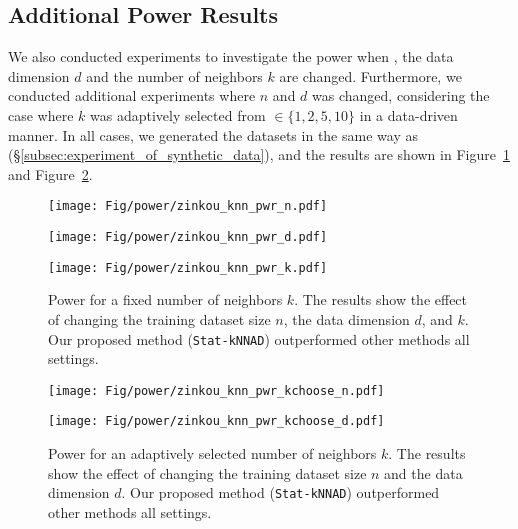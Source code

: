 \subsection{Additional Power Results}
\label{app:appC2}
%
We also conducted experiments to investigate the power when , the data dimension $d$ and the number of neighbors $k$ are changed.
%
%
Furthermore, we conducted additional experiments where $n$ and $d$ was changed, considering the case where $k$ was adaptively selected from $\in \{1, 2, 5, 10\}$ in a data-driven manner.
%
In all cases, we generated the datasets in the same way as  (\S{\ref{subsec:experiment_of_synthetic_data}}), and the results are shown in Figure~\ref{fig:power_fixed_k} and Figure~\ref{fig:power_adaptive_k}.


\begin{figure}[H]
  \centering
  \begin{minipage}[b]{0.32\linewidth}
      \centering
      \texttt{[image: Fig/power/zinkou\_knn\_pwr\_n.pdf]}
  \end{minipage}
  \begin{minipage}[b]{0.32\linewidth}
      \centering
      \texttt{[image: Fig/power/zinkou\_knn\_pwr\_d.pdf]}
  \end{minipage}
  \begin{minipage}[b]{0.32\linewidth}
      \centering
      \texttt{[image: Fig/power/zinkou\_knn\_pwr\_k.pdf]}
  \end{minipage}
  \caption{
      Power for a fixed number of neighbors $k$. 
      The results show the effect of changing the training dataset size $n$, the data dimension $d$, and $k$. 
      Our proposed method (\texttt{Stat-kNNAD}) outperformed other methods  all settings.
  }
  \label{fig:power_fixed_k}
\end{figure}

\begin{figure}[H]
  \centering
  \begin{minipage}[b]{0.32\linewidth}
      \centering
      \texttt{[image: Fig/power/zinkou\_knn\_pwr\_kchoose\_n.pdf]}
  \end{minipage}
  \begin{minipage}[b]{0.32\linewidth}
      \centering
      \texttt{[image: Fig/power/zinkou\_knn\_pwr\_kchoose\_d.pdf]}
  \end{minipage}
  \caption{
      Power for an adaptively selected number of neighbors $k$. 
      The results show the effect of changing the training dataset size $n$ and the data dimension $d$.
      Our proposed method (\texttt{Stat-kNNAD}) outperformed other methods  all settings.
  }
  \label{fig:power_adaptive_k}
\end{figure}

